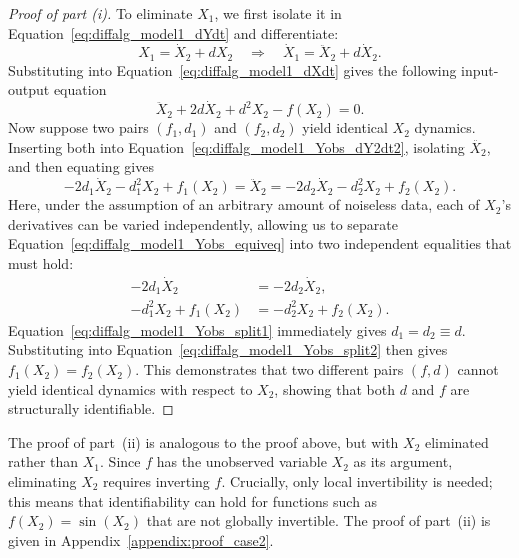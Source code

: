 \documentclass{article}
\theoremstyle{plain}
\theoremstyle{definition}
\begin{document}
{\begin{proof}[Proof of part (i)]
To eliminate $X_1$, we first isolate it in Equation~\eqref{eq:diffalg_model1_dYdt} and differentiate:
\begin{equation*}
    X_1= \dot{X}_2 + dX_2 \quad \Longrightarrow \quad \dot{X}_1 = \ddot{X}_2 + d\dot{X}_2.
\end{equation*}
Substituting into Equation~\eqref{eq:diffalg_model1_dXdt} gives the following input-output equation
\begin{equation}
    \label{eq:diffalg_model1_Yobs_dY2dt2}
    \ddot{X}_2 + 2d\dot{X}_2 + d^2 X_2 - f(X_2) = 0.
\end{equation}
Now suppose two pairs $(f_1, d_1)$ and $(f_2, d_2)$ yield identical $X_2$ dynamics. Inserting both into Equation~\eqref{eq:diffalg_model1_Yobs_dY2dt2}, isolating $\ddot{X_2}$, and then equating gives
\begin{equation}
    \label{eq:diffalg_model1_Yobs_equiveq}
    -2d_1\dot{X}_2 - d_1^2 X_2 + f_1(X_2) = \ddot{X}_2 = -2d_2\dot{X}_2 - d_2^2 X_2 + f_2(X_2).
\end{equation}
Here, under the assumption of an arbitrary amount of noiseless data, each of $X_2$'s derivatives can be varied independently, allowing us to separate Equation~\eqref{eq:diffalg_model1_Yobs_equiveq} into two independent equalities that must hold:
\begin{align}
    -2d_1\dot{X}_2       &= -2d_2\dot{X}_2,       \label{eq:diffalg_model1_Yobs_split1} \\
    -d_1^2 X_2 + f_1(X_2) &= -d_2^2 X_2 + f_2(X_2).  \label{eq:diffalg_model1_Yobs_split2}
\end{align}
Equation~\eqref{eq:diffalg_model1_Yobs_split1} immediately gives $d_1 = d_2 \equiv d$. Substituting into Equation~\eqref{eq:diffalg_model1_Yobs_split2} then gives $f_1(X_2) = f_2(X_2)$. This demonstrates that two different pairs $(f, d)$ cannot yield identical dynamics with respect to $X_2$, showing that both $d$ and $f$ are structurally identifiable.
\end{proof}

The proof of part~(ii) is analogous to the proof above, but with $X_2$ eliminated rather than $X_1$. Since $f$ has the unobserved variable $X_2$ as its argument, eliminating $X_2$ requires inverting $f$. Crucially, only local invertibility is needed; this means that identifiability can hold for functions such as $f(X_2)=\sin(X_2)$ that are not globally invertible. The proof of part~(ii) is given in Appendix~\ref{appendix:proof_case2}.

}
\end{document}

